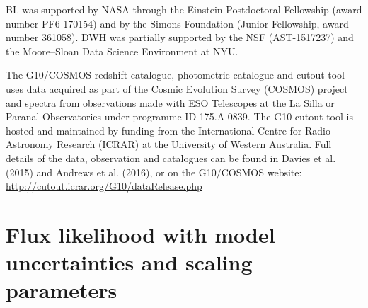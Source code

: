 \documentclass[aps,prd,showpacs,superscriptaddress,groupedaddress]{revtex4}  %
\begin{document}
BL was supported by NASA through the Einstein Postdoctoral Fellowship (award number PF6-170154) and by the Simons Foundation (Junior Fellowship, award number 361058).
DWH was partially supported by the NSF (AST-1517237) and the Moore--Sloan Data Science Environment at NYU.

The G10/COSMOS redshift catalogue, photometric catalogue and cutout tool uses data acquired as part of the Cosmic Evolution Survey (COSMOS) project and spectra from observations made with ESO Telescopes at the La Silla or Paranal Observatories under programme ID 175.A-0839. The G10 cutout tool is hosted and maintained by funding from the International Centre for Radio Astronomy Research (ICRAR) at the University of Western Australia. Full details of the data, observation and catalogues can be found in Davies et al. (2015) and Andrews et al. (2016), or on the G10/COSMOS website: \url{http://cutout.icrar.org/G10/dataRelease.php}



\appendix

\section{Flux likelihood with model uncertainties and scaling parameters}\label{app:fluxlikelihood}
\end{document}
